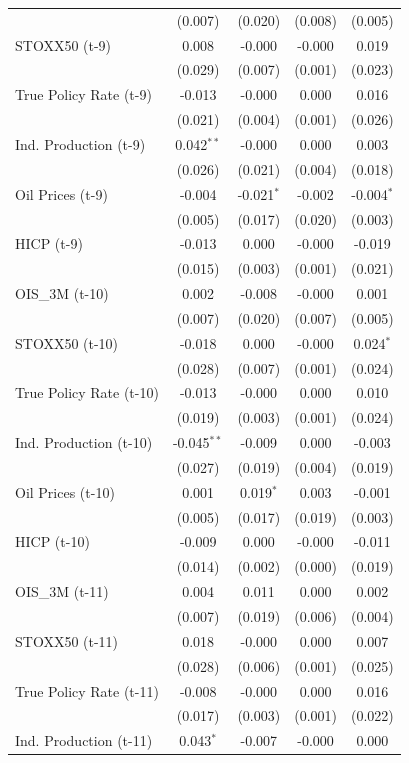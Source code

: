 \begin{longtable}[t]{lcccc}
 & (0.007) & (0.020) & (0.008) & (0.005)\\
STOXX50 (t-9) & 0.008 & -0.000 & -0.000 & 0.019\\
 & (0.029) & (0.007) & (0.001) & (0.023)\\
True Policy Rate (t-9) & -0.013 & -0.000 & 0.000 & 0.016\\
 & (0.021) & (0.004) & (0.001) & (0.026)\\
Ind. Production (t-9) & 0.042$^{**}$ & -0.000 & 0.000 & 0.003\\
 & (0.026) & (0.021) & (0.004) & (0.018)\\
Oil Prices (t-9) & -0.004 & -0.021$^{*}$ & -0.002 & -0.004$^{*}$\\
 & (0.005) & (0.017) & (0.020) & (0.003)\\
HICP (t-9) & -0.013 & 0.000 & -0.000 & -0.019\\
 & (0.015) & (0.003) & (0.001) & (0.021)\\
OIS\_3M (t-10) & 0.002 & -0.008 & -0.000 & 0.001\\
 & (0.007) & (0.020) & (0.007) & (0.005)\\
STOXX50 (t-10) & -0.018 & 0.000 & -0.000 & 0.024$^{*}$\\
 & (0.028) & (0.007) & (0.001) & (0.024)\\
True Policy Rate (t-10) & -0.013 & -0.000 & 0.000 & 0.010\\
 & (0.019) & (0.003) & (0.001) & (0.024)\\
Ind. Production (t-10) & -0.045$^{**}$ & -0.009 & 0.000 & -0.003\\
 & (0.027) & (0.019) & (0.004) & (0.019)\\
Oil Prices (t-10) & 0.001 & 0.019$^{*}$ & 0.003 & -0.001\\
 & (0.005) & (0.017) & (0.019) & (0.003)\\
HICP (t-10) & -0.009 & 0.000 & -0.000 & -0.011\\
 & (0.014) & (0.002) & (0.000) & (0.019)\\
OIS\_3M (t-11) & 0.004 & 0.011 & 0.000 & 0.002\\
 & (0.007) & (0.019) & (0.006) & (0.004)\\
STOXX50 (t-11) & 0.018 & -0.000 & 0.000 & 0.007\\
 & (0.028) & (0.006) & (0.001) & (0.025)\\
True Policy Rate (t-11) & -0.008 & -0.000 & 0.000 & 0.016\\
 & (0.017) & (0.003) & (0.001) & (0.022)\\
Ind. Production (t-11) & 0.043$^{*}$ & -0.007 & -0.000 & 0.000\\

\end{longtable}
